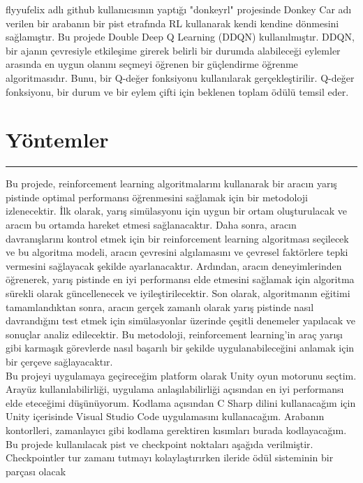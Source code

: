\documentclass{article}
\begin{document}
\newpage

\noindent
flyyufelix adlı github kullanıcısının yaptığı "donkeyrl" projesinde\cite{flyyufelix} Donkey Car adı verilen bir arabanın bir pist etrafında RL kullanarak kendi kendine dönmesini sağlamıştır. Bu projede Double Deep Q Learning (DDQN) kullanılmıştır. DDQN, bir ajanın çevresiyle etkileşime girerek belirli bir durumda alabileceği eylemler arasında en uygun olanını seçmeyi öğrenen bir güçlendirme öğrenme algoritmasıdır. Bunu, bir Q-değer fonksiyonu kullanılarak gerçekleştirilir. Q-değer fonksiyonu, bir durum ve bir eylem çifti için beklenen toplam ödülü temsil eder.\\[15pt]

\section{Yöntemler}
\rule{\textwidth}{0.5pt}
Bu projede, reinforcement learning algoritmalarını kullanarak bir aracın yarış pistinde optimal performansı öğrenmesini sağlamak için bir metodoloji izlenecektir. İlk olarak, yarış simülasyonu için uygun bir ortam oluşturulacak ve aracın bu ortamda hareket etmesi sağlanacaktır. Daha sonra, aracın davranışlarını kontrol etmek için bir reinforcement learning algoritması seçilecek ve bu algoritma modeli, aracın çevresini algılamasını ve çevresel faktörlere tepki vermesini sağlayacak şekilde ayarlanacaktır. Ardından, aracın deneyimlerinden öğrenerek, yarış pistinde en iyi performansı elde etmesini sağlamak için algoritma sürekli olarak güncellenecek ve iyileştirilecektir. Son olarak, algoritmanın eğitimi tamamlandıktan sonra, aracın gerçek zamanlı olarak yarış pistinde nasıl davrandığını test etmek için simülasyonlar üzerinde çeşitli denemeler yapılacak ve sonuçlar analiz edilecektir. Bu metodoloji, reinforcement learning'in araç yarışı gibi karmaşık görevlerde nasıl başarılı bir şekilde uygulanabileceğini anlamak için bir çerçeve sağlayacaktır.\\[5pt]
\newline
Bu projeyi uygulamaya geçireceğim platform olarak Unity oyun motorunu seçtim. Arayüz kullanılabilirliği, uygulama anlaşılabilirliği açısından en iyi performansı elde eteceğimi düşünüyorum. Kodlama açısından C Sharp dilini kullanacağım için Unity içerisinde Visual Studio Code uygulamasını kullanacağım. Arabanın kontorlleri, zamanlayıcı gibi kodlama gerektiren kısımları burada kodlayacağım.\\[5pt]
\newline
Bu projede kullanılacak pist ve checkpoint noktaları aşağıda verilmiştir. Checkpointler tur zamanı tutmayı kolaylaştırırken ileride ödül sisteminin bir parçası olacak\\[5pt]
\end{document}
